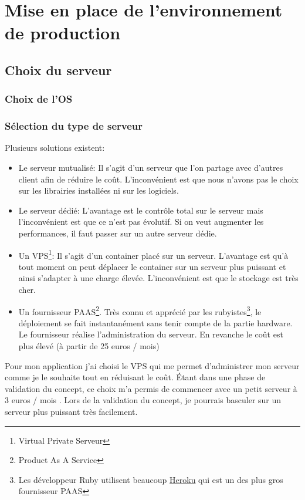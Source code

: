 \documentclass[]{report}
\begin{document}

\chapter{Mise en place de l’environnement de production}

  \section{Choix du serveur}

    \subsection{Choix de l'OS}

    \subsection{Sélection du type de serveur}

      Plusieurs solutions existent:

      \begin{itemize}
        \item Le serveur mutualisé: Il s’agit d’un serveur que l’on partage avec d’autres client afin de réduire le coût. L’inconvénient est que nous n’avons pas le choix sur les librairies installées ni sur les logiciels.
        \item Le serveur dédié: L’avantage est le contrôle total sur le serveur mais l’inconvénient est que ce n’est pas évolutif. Si on veut augmenter les performances, il faut passer sur un autre serveur dédie.
        \item Un VPS\footnote{Virtual Private Serveur}: Il s’agit d’un container placé sur un serveur. L’avantage est qu’à tout moment on peut déplacer le container sur un serveur plus puissant et ainsi s’adapter à une charge élevée. L’inconvénient est que le stockage est très cher.
        \item Un fournisseur PAAS\footnote{Product As A Service}. Très connu et apprécié par les rubyistes\footnote{Les développeur Ruby utilisent beaucoup  \href{https://www.heroku.com}{Heroku} qui est un des plus gros fournisseur PAAS}, le déploiement se fait instantanément sans tenir compte de la partie hardware.  Le fournisseur réalise l’administration du serveur. En revanche le coût est plus élevé (à partir de 25 euros / mois)
      \end{itemize}

      Pour mon application j’ai choisi le VPS qui me permet d’administrer mon serveur comme je le souhaite tout en réduisant le coût. Étant dans une phase de validation du concept, ce choix m’a permis de commencer avec un petit serveur à 3 euros / mois . Lors de la validation du concept, je pourrais basculer sur un serveur plus puissant très facilement.
\end{document}
